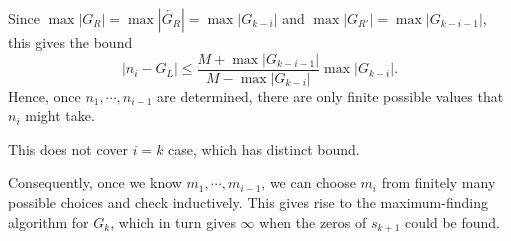 \documentclass{article}
\theoremstyle{definition}
\theoremstyle{plain}
\theoremstyle{remark}
\numberwithin{equation}{section}
\newcommand{\abs}[1]{\left\lvert{#1}\right\rvert}
\begin{document}
Since $\max \abs{G_R} = \max \abs{\overleftarrow{G_R}} = \max \abs{G_{k - i}}$
and $\max \abs{G_{R'}} = \max \abs{G_{k-i-1}}$,
this gives the bound
\[
  \abs{n_i - G_L} \leq \frac{M + \max \abs{G_{k-i-1}}}{M - \max \abs{G_{k-i}}} \max \abs{G_{k-i}}.
\]
Hence, once $n_1, \cdots, n_{i-1}$ are determined,
there are only finite possible values that $n_i$ might take.

This does not cover $i = k$ case, which has distinct bound.

Consequently, once we know $m_1, \cdots, m_{i-1}$,
we can choose $m_i$ from finitely many possible choices and check inductively.
This gives rise to the maximum-finding algorithm for $G_k$,
which in turn gives $\infty$ when the zeros of $s_{k+1}$ could be found.
\end{document}
